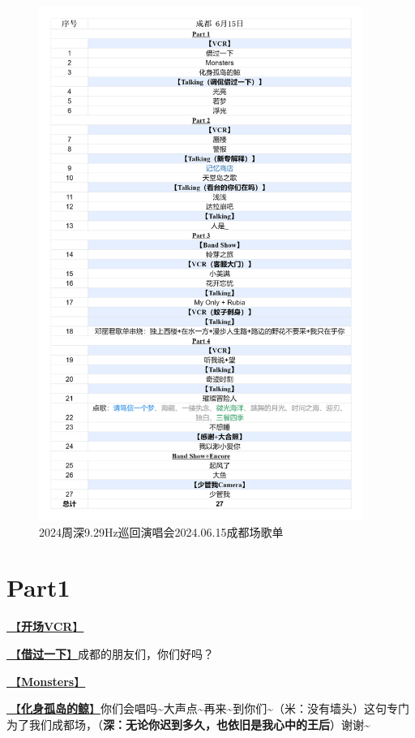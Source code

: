 \documentclass[]{ctexbook}
\begin{document}
\begin{figure}

{\centering \includegraphics[width=300pt]{img/playlists/playlists-chengdu-20240615} 

}

\caption{2024周深9.29Hz巡回演唱会2024.06.15成都场歌单}\label{fig:unnamed-chunk-51}
\end{figure}

\newpage

\section{Part1}\label{chengdu-20240615-part1}

\hyperref[opening-vcr]{🎥【\textbf{开场VCR}】}

\hyperref[I-will-go-my-way]{🎵【\textbf{借过一下}】}成都的朋友们，你们好吗？

\hyperref[Monsters]{🎵【\textbf{Monsters}】}

\hyperref[hua-shen-gu-dao-de-jing]{🎵【\textbf{化身孤岛的鲸}】}你们会唱吗\textasciitilde 大声点\textasciitilde 再来\textasciitilde 到你们\textasciitilde（米：没有墙头）这句专门为了我们成都场，（\textbf{深：无论你迟到多久，也依旧是我心中的王后}）谢谢\textasciitilde{}
\end{document}

